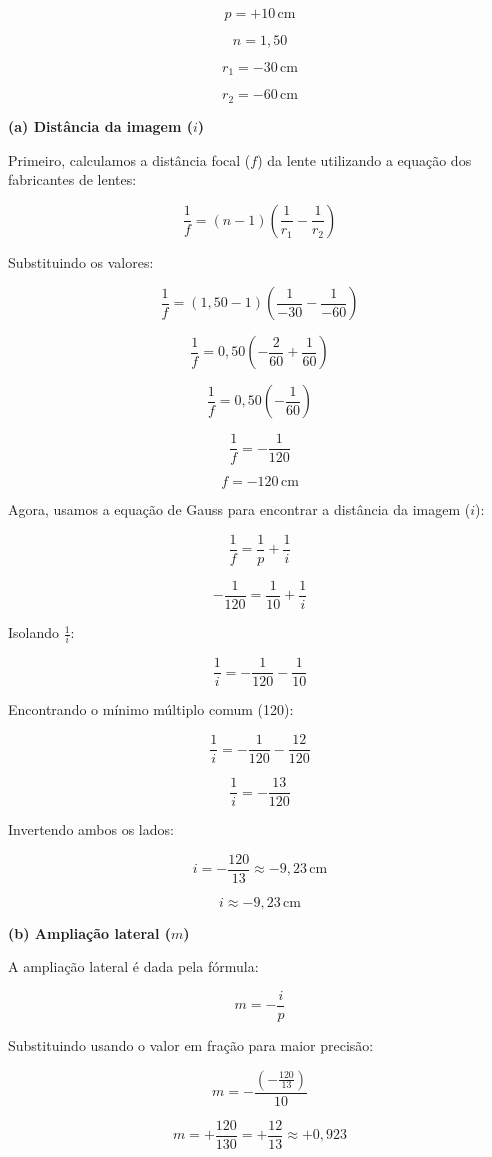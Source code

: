 \documentclass[12pt,a4paper]{article}
\begin{document}
\[
p = +10\,\text{cm}
\]

\[
n = 1,50
\]

\[
r_1 = -30\,\text{cm}
\]

\[
r_2 = -60\,\text{cm}
\]

\textbf{(a) Distância da imagem (\(i\))}

Primeiro, calculamos a distância focal (\(f\)) da lente utilizando a equação dos fabricantes de lentes:

\[
\frac{1}{f} = (n - 1) \left( \frac{1}{r_1} - \frac{1}{r_2} \right)
\]

Substituindo os valores:

\[
\frac{1}{f} = (1,50 - 1) \left( \frac{1}{-30} - \frac{1}{-60} \right)
\]

\[
\frac{1}{f} = 0,50 \left( -\frac{2}{60} + \frac{1}{60} \right)
\]

\[
\frac{1}{f} = 0,50 \left( -\frac{1}{60} \right)
\]

\[
\frac{1}{f} = -\frac{1}{120}
\]

\[
f = -120\,\text{cm}
\]

Agora, usamos a equação de Gauss para encontrar a distância da imagem (\(i\)):

\[
\frac{1}{f} = \frac{1}{p} + \frac{1}{i}
\]

\[
-\frac{1}{120} = \frac{1}{10} + \frac{1}{i}
\]

Isolando \(\frac{1}{i}\):

\[
\frac{1}{i} = -\frac{1}{120} - \frac{1}{10}
\]

Encontrando o mínimo múltiplo comum (120):

\[
\frac{1}{i} = -\frac{1}{120} - \frac{12}{120}
\]

\[
\frac{1}{i} = -\frac{13}{120}
\]

Invertendo ambos os lados:

\[
i = -\frac{120}{13} \approx -9,23\,\text{cm}
\]

\[
\boxed{i \approx -9,23\,\text{cm}}
\]

\textbf{(b) Ampliação lateral (\(m\))}

A ampliação lateral é dada pela fórmula:

\[
m = -\frac{i}{p}
\]

Substituindo usando o valor em fração para maior precisão:

\[
m = -\frac{\left(-\frac{120}{13}\right)}{10}
\]

\[
m = +\frac{120}{130} = +\frac{12}{13} \approx +0,923
\]
\end{document}
